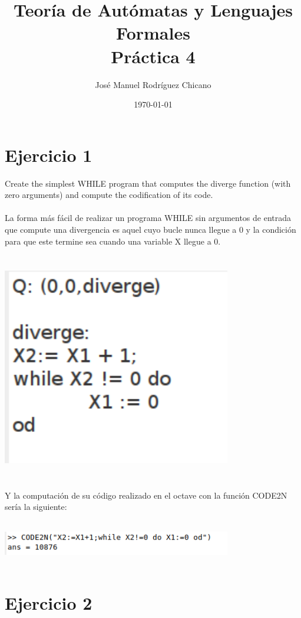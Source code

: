 \documentclass[fleqn, 10pt]{article}
\title{Teoría de Autómatas y Lenguajes Formales\\[.4\baselineskip]Práctica 4}
\author{José Manuel Rodríguez Chicano}
\date{\today}
\theoremstyle{plain}
\theoremstyle{definition}
\begin{document}
\maketitle

\section{Ejercicio 1}

Create the simplest WHILE program that computes the diverge function (with
zero arguments) and compute the codification of its code.
\\
\\
La forma más fácil de realizar un programa WHILE sin argumentos de entrada que compute una divergencia es aquel cuyo bucle nunca llegue a 0 y la condición para que este termine sea cuando una variable X llegue a 0.
\begin{center}
\includegraphics[width=10cm, height=10cm]{2.png}
\end{center}
Y la computación de su código realizado en el octave con la función CODE2N sería la siguiente:


\begin{center}
\includegraphics[width=10cm, height=2cm]{1.png}
\end{center}

\section{Ejercicio 2}
\end{document}
